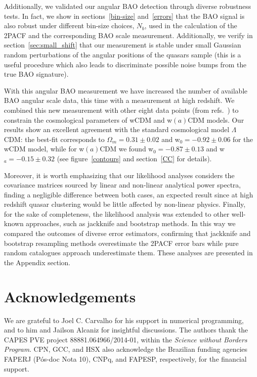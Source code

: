 \documentclass[a4paper,11pt]{article}
\begin{document}
Additionally, we validated our angular BAO detection through diverse robustness tests. 
In fact, we show in sections~\ref{bin-size} and~\ref{errors} that the BAO signal is also robust under 
different bin-size choices, $N_{b}$, used in the calculation of the 2PACF and the corresponding BAO 
scale measurement. 
Additionally, we verify in section~\ref{sec:small_shift} that our measurement is stable under small 
Gaussian random perturbations of the angular positions of the quasars sample (this is a useful 
procedure which also leads to discriminate possible noise bumps from the true BAO signature). 


With this angular BAO measurement we have increased the number of available BAO angular 
scale data, this time with a measurement at high redshift. 
We combined this new measurement with other eight data points (from 
refs.~\cite{Carvalho,Alcaniz}) to constrain the cosmological parameters of wCDM and w$(a)$CDM 
models. 
Our results show an excellent agreement with the standard cosmological model 
$\Lambda$CDM: the best-fit corresponds to 
$\Omega_m= 0.31 \pm 0.02$ and w$_0 = -0.92 \pm 0.06$ for the wCDM model, 
while for w$(a)$CDM we found w$_0= -0.87 \pm 0.13$ and w$_a= -0.15 \pm 0.32$ (see 
figure~\ref{contours} and section~\ref{CC} for details). 


Moreover, it is worth emphasizing that our likelihood analyses considers the covariance matrices 
sourced by linear and non-linear analytical power spectra, finding a negligible difference between 
both cases, an expected result since at high redshift quasar clustering would be little affected 
by non-linear physics. 
Finally, for the sake of completeness, the likelihood analysis was extended to other well-known 
approaches, such as jackknife and bootstrap methods. 
In this way we compared the outcomes of diverse error estimators, confirming that jackknife and 
bootstrap resampling methods overestimate the 2PACF error bars while pure random catalogues 
approach underestimate them. These analyses are presented in the Appendix section. 



\section*{Acknowledgements}
We are grateful to Joel C. Carvalho for his support in numerical programming, and to him and Jailson 
Alcaniz for insightful discussions. 
The authors thank the CAPES PVE project 88881.064966/2014-01, within the {\em Science 
without Borders Program}. 
CPN, GCC, and HSX also acknowledge the Brazilian funding agencies FAPERJ (P\'os-doc Nota 10), 
CNPq, and FAPESP, respectively, for the financial support. 
\end{document}
